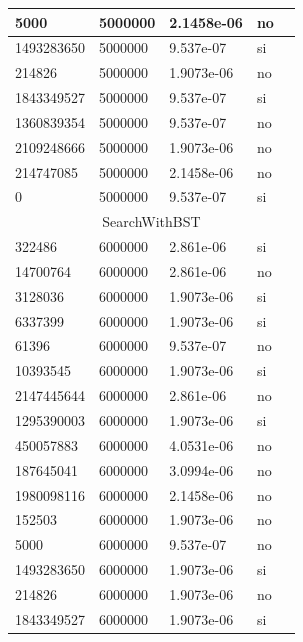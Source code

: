\documentclass[12pt, fleqn]{article}                             %
\theoremstyle{break}                                            %
\begin{document}
\begin{longtable}{|m{5em}|m{5em}|m{10em}|m{5em}|@{}m{0pt}@{}}
            5000& 5000000  & 2.1458e-06 & no &\\[1em]    \hline
            1493283650& 5000000  & 9.537e-07 & si &\\[1em]    \hline
            214826& 5000000  & 1.9073e-06 & no &\\[1em]    \hline
            1843349527& 5000000  & 9.537e-07 & si &\\[1em]    \hline
            1360839354& 5000000  & 9.537e-07 & no &\\[1em]    \hline
            2109248666& 5000000  & 1.9073e-06 & no &\\[1em]    \hline
            214747085& 5000000  & 2.1458e-06 & no &\\[1em]    \hline
            0& 5000000  & 9.537e-07 & si &\\[1em]    \hline
            \multicolumn{5}{|c|}{SearchWithBST}   \\          \hline
            322486& 6000000  & 2.861e-06 & si &\\[1em]    \hline
            14700764& 6000000  & 2.861e-06 & no &\\[1em]    \hline
            3128036& 6000000  & 1.9073e-06 & si &\\[1em]    \hline
            6337399& 6000000  & 1.9073e-06 & si &\\[1em]    \hline
            61396& 6000000  & 9.537e-07 & no &\\[1em]    \hline
            10393545& 6000000  & 1.9073e-06 & si &\\[1em]    \hline
            2147445644& 6000000  & 2.861e-06 & no &\\[1em]    \hline
            1295390003& 6000000  & 1.9073e-06 & si &\\[1em]    \hline
            450057883& 6000000  & 4.0531e-06 & no &\\[1em]    \hline
            187645041& 6000000  & 3.0994e-06 & no &\\[1em]    \hline
            1980098116& 6000000  & 2.1458e-06 & no &\\[1em]    \hline
            152503& 6000000  & 1.9073e-06 & no &\\[1em]    \hline
            5000& 6000000  & 9.537e-07 & no &\\[1em]    \hline
            1493283650& 6000000  & 1.9073e-06 & si &\\[1em]    \hline
            214826& 6000000  & 1.9073e-06 & no &\\[1em]    \hline
            1843349527& 6000000  & 1.9073e-06 & si &\\[1em]    \hline

\end{longtable}
\end{document}
